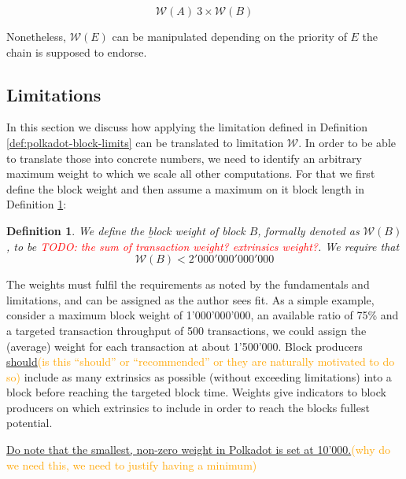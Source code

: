 \documentclass[11pt,a4paper]{article}
\newtheorem{definition}{Definition}
\newcommand{\syed}[2]{{\underline{#1}}\textcolor{orange}{(#2)}}
\newcommand{\todo}[1]{\textcolor{red}{TODO: #1}}
\newcommand{\TWF}{\ensuremath{\mathcal{W}}}
\begin{document}
\[
\TWF(A)~3\times \TWF(B)
\]

Nonetheless, $\TWF(E)$ can be manipulated depending on the priority of $E$ the chain is supposed to endorse.

\subsection{Limitations}\label{sec:limitations}
In this section we discuss how applying the limitation defined in Definition \ref{def:polkadot-block-limits} can be translated to limitation $\TWF$. In order to be able to translate those into concrete numbers, we need to identify an arbitrary maximum weight to which we scale all other computations. For that we first define the block weight and then assume a maximum on it block length in Definition \ref{def:block-weight}:

\begin{definition}
  \label{def:block-weight} We define the {\b block weight} of block $B$, formally denoted as  $\TWF(B)$, to be \todo{the sum of transaction weight? extrinsics weight?}. 
  We require that
  \[
\TWF(B) < 2'000'000'000'000
\]

\end{definition}

The weights must fulfil the requirements as noted by the fundamentals and limitations, and can be assigned as the author sees fit. As a simple example, consider a maximum block weight of 1'000'000'000, an available ratio of 75\% and a targeted transaction throughput of 500 transactions, we could assign the (average) weight for each transaction at about 1'500'000. Block producers \syed{should}{is this ``should'' or ``recommended'' or they are naturally  motivated to do so} include as many extrinsics as possible (without exceeding limitations) into a block before reaching the targeted block time. Weights give indicators to block producers on which extrinsics to include in order to reach the blocks fullest
potential.
\newline

\syed{Do note that the smallest, non-zero weight in Polkadot is set at 10'000.}{why do we need this, we need to justify having a minimum}
\end{document}

